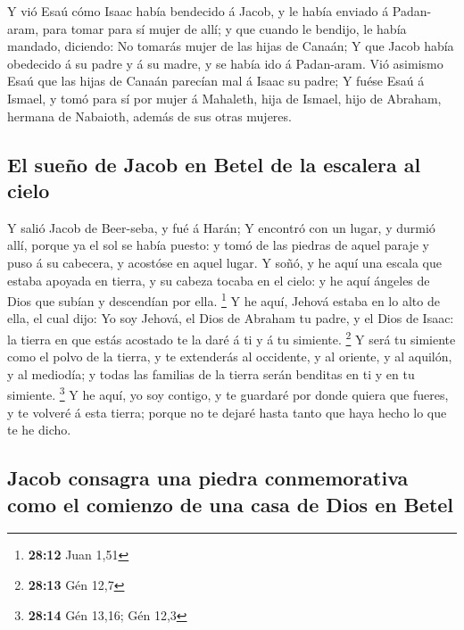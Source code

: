  Y vió Esaú cómo Isaac había bendecido á Jacob, y le había
enviado á Padan-aram, para tomar para sí mujer de allí; y que cuando le
bendijo, le había mandado, diciendo: No tomarás mujer de las hijas de
Canaán;  Y que Jacob había obedecido á su padre y á su
madre, y se había ido á Padan-aram.  Vió asimismo Esaú que
las hijas de Canaán parecían mal á Isaac su padre;  Y
fuése Esaú á Ismael, y tomó para sí por mujer á Mahaleth, hija de
Ismael, hijo de Abraham, hermana de Nabaioth, además de sus otras
mujeres.

\hypertarget{el-sueuxf1o-de-jacob-en-betel-de-la-escalera-al-cielo}{%
\subsection{El sueño de Jacob en Betel de la escalera al
cielo}\label{el-sueuxf1o-de-jacob-en-betel-de-la-escalera-al-cielo}}

 Y salió Jacob de Beer-seba, y fué á Harán;
 Y encontró con un lugar, y durmió allí, porque ya el sol
se había puesto: y tomó de las piedras de aquel paraje y puso á su
cabecera, y acostóse en aquel lugar.  Y soñó, y he aquí
una escala que estaba apoyada en tierra, y su cabeza tocaba en el cielo:
y he aquí ángeles de Dios que subían y descendían por ella. \footnote{\textbf{28:12}
  Juan 1,51}  Y he aquí, Jehová estaba en lo alto de
ella, el cual dijo: Yo soy Jehová, el Dios de Abraham tu padre, y el
Dios de Isaac: la tierra en que estás acostado te la daré á ti y á tu
simiente. \footnote{\textbf{28:13} Gén 12,7}  Y será tu
simiente como el polvo de la tierra, y te extenderás al occidente, y al
oriente, y al aquilón, y al mediodía; y todas las familias de la tierra
serán benditas en ti y en tu simiente. \footnote{\textbf{28:14} Gén
  13,16; Gén 12,3}  Y he aquí, yo soy contigo, y te
guardaré por donde quiera que fueres, y te volveré á esta tierra; porque
no te dejaré hasta tanto que haya hecho lo que te he dicho.

\hypertarget{jacob-consagra-una-piedra-conmemorativa-como-el-comienzo-de-una-casa-de-dios-en-betel}{%
\subsection{Jacob consagra una piedra conmemorativa como el comienzo de
una casa de Dios en
Betel}\label{jacob-consagra-una-piedra-conmemorativa-como-el-comienzo-de-una-casa-de-dios-en-betel}}

